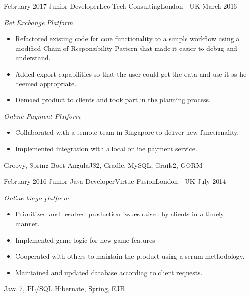 \begin{experiences}
    \experience
      {February 2017}
      {Junior Developer}{Leo Tech Consulting}{London - UK}
      {March 2016}
      {
        \emph{Bet Exchange Platform}
        \begin{itemize}
          \item Refactored existing code for core functionality to a simple workflow using a modified Chain of Responsibility Pattern that made it easier to debug and understand.
          \item Added export capabilities so that the user could get the data and use it as he deemed appropriate.
          \item Demoed product to clients and took part in the planning process.
        \end{itemize}

        \emph{Online Payment Platform}
        \begin{itemize}
          \item Collaborated with a remote team in Singapore to deliver new functionality.
          \item Implemented integration with a local online payment service.
        \end{itemize}
      }
      {Groovy, Spring Boot}
      {AngulaJS2, Gradle, MySQL, Grails2, GORM}
    \emptySeparator

    \experience
      {February 2016}
      {Junior Java Developer}{Virtue Fusion}{London - UK}
      {July 2014}
      {
        \emph{Online bingo platform}
        \begin{itemize}
          \item Prioritized and resolved production issues raised by clients in a timely manner.
          \item Implemented game logic for new game features.
          \item Cooperated with others to maintain the product using a scrum methodology.
          \item Maintained and updated database according to client requests.
        \end{itemize}
      }
      {Java 7, PL/SQL}
      {Hibernate, Spring, EJB}
    \emptySeparator


\end{experiences}
